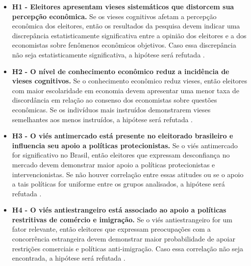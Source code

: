 \begin{itemize}
    
    \item \textbf{H1 - Eleitores apresentam vieses sistemáticos que distorcem sua percepção econômica.}  
    Se os vieses cognitivos afetam a percepção econômica dos eleitores, então os resultados da pesquisa devem indicar uma discrepância estatisticamente significativa entre a opinião dos eleitores e a dos economistas sobre fenômenos econômicos objetivos. Caso essa discrepância não seja estatisticamente significativa, a hipótese será refutada \cite{The_Myth_of_the_Rational_Voter}.  

    \item \textbf{H2 - O nível de conhecimento econômico reduz a incidência de vieses cognitivos.}  
    Se o conhecimento econômico reduz vieses, então eleitores com maior escolaridade em economia devem apresentar uma menor taxa de discordância em relação ao consenso dos economistas sobre questões econômicas. Se os indivíduos mais instruídos demonstrarem vieses semelhantes aos menos instruídos, a hipótese será refutada \cite{downs1957economic}.  

    \item \textbf{H3 - O viés antimercado está presente no eleitorado brasileiro e influencia seu apoio a políticas protecionistas.}  
    Se o viés antimercado for significativo no Brasil, então eleitores que expressam desconfiança no mercado devem demonstrar maior apoio a políticas protecionistas e intervencionistas. Se não houver correlação entre essas atitudes ou se o apoio a tais políticas for uniforme entre os grupos analisados, a hipótese será refutada \cite{The_Myth_of_the_Rational_Voter}.  

    \item \textbf{H4 - O viés antiestrangeiro está associado ao apoio a políticas restritivas de comércio e imigração.}  
    Se o viés antiestrangeiro for um fator relevante, então eleitores que expressam preocupações com a concorrência estrangeira devem demonstrar maior probabilidade de apoiar restrições comerciais e políticas anti-imigração. Caso essa correlação não seja encontrada, a hipótese será refutada \cite{The_Myth_of_the_Rational_Voter}.  


\end{itemize}
